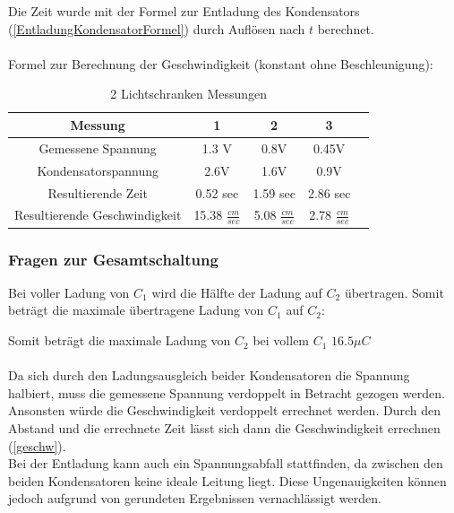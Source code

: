 Die Zeit wurde mit der Formel zur Entladung des Kondensators (\ref{EntladungKondensatorFormel}) durch Auflösen nach $t$ berechnet.
\\
\\
Formel zur Berechnung der Geschwindigkeit (konstant ohne Beschleunigung):


\newpage

\begin{table}[htb]
\centering
\caption{2 Lichtschranken Messungen}
\label{Lichtschranken2Messung}
\begin{tabular}{c|cccc}
\toprule
Messung & 1 & 2 & 3 \\
\midrule
Gemessene Spannung & 1.3 V & 0.8V & 0.45V \\
Kondensatorspannung & 2.6V & 1.6V & 0.9V \\
Resultierende Zeit & 0.52 sec & 1.59 sec & 2.86 sec \\
Resultierende Geschwindigkeit & 15.38 $\frac{cm}{sec}$ & 5.08 $\frac{cm}{sec}$ & 2.78 $\frac{cm}{sec}$ \\
\bottomrule
\end{tabular}
\end{table}

\subsubsection{Fragen zur Gesamtschaltung}

Bei voller Ladung von $C_{1}$ wird die Hälfte der Ladung auf $C_{2}$ übertragen. Somit beträgt die maximale übertragene Ladung von $C_{1}$ auf $C_{2}$:


Somit beträgt die maximale Ladung von $C_{2}$ bei vollem $C_{1}$ $16.5 \mu C$
\\
\\
Da sich durch den Ladungsausgleich beider Kondensatoren die Spannung halbiert, muss die gemessene Spannung verdoppelt in Betracht gezogen werden. Ansonsten würde die Geschwindigkeit verdoppelt errechnet werden. Durch den Abstand und die errechnete Zeit lässt sich dann die Geschwindigkeit errechnen (\ref{geschw}). 
\\
Bei der Entladung kann auch ein Spannungsabfall stattfinden, da zwischen den beiden Kondensatoren keine ideale Leitung liegt. Diese Ungenauigkeiten können jedoch aufgrund von gerundeten Ergebnissen vernachlässigt werden.

